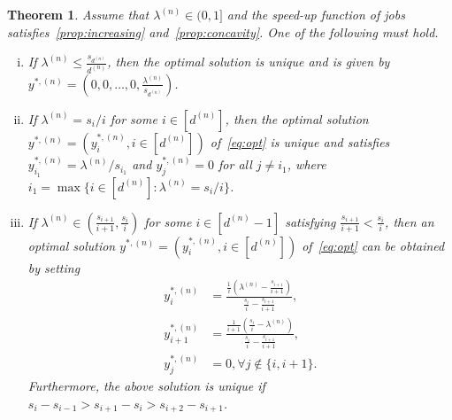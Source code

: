 \documentclass[a4paper]{article}
\theoremstyle{plain}
\newtheorem{thm}{Theorem}%
\theoremstyle{definition}
\theoremstyle{case}
\theoremstyle{remark}
\newcommand{\brac}[1]{\left(#1\right)}
\begin{document}
\begin{thm} 
\label{thm:optimization}
Assume that $\lambda^{(n)} \in (0,1]$ and the speed-up function of jobs satisfies~\eqref{prop:increasing} and~\eqref{prop:concavity}.
One of the following must hold.
\begin{enumerate}[(i)]
    \item If $\lambda^{(n)} \leq \frac{s_{d^{(n)}}}{d^{(n)}}$, then the optimal solution is unique and is given by $y^{*,(n)}=\left(0,0,\ldots,0,\frac{\lambda^{(n)}}{s_{d^{(n)}}}\right)$.
    
    \item If $\lambda^{(n)}=s_i/i$ for some $i \in [d^{(n)}]$, then the optimal solution $y^{*,(n)}=(y^{*,(n)}_i, i\in [d^{(n)}])$ of~\eqref{eq:opt} is unique and satisfies $y_{i_1}^{*,(n)}=\lambda^{(n)}/s_{i_1}$ and $y_j^{*,(n)}=0$ for all $j\neq i_1$, where $i_1=\max\{i\in [d^{(n)}]: \lambda^{(n)}=s_i/i\}$.
    
    \item If $\lambda^{(n)} \in \left(\frac{s_{i+1}}{i+1},\frac{s_i}{i}\right)$ for some $i\in [d^{(n)}-1]$ satisfying $\frac{s_{i+1}}{i+1}<\frac{s_i}{i}$, then an optimal solution $y^{*,(n)}=(y^{*,(n)}_i, i\in [d^{(n)}])$ of~\eqref{eq:opt} can be obtained by setting
    \begin{align}
        y_i^{*,(n)}&=\frac{\frac{1}{i}\brac{\lambda^{(n)}-\frac{s_{i+1}}{i+1}}}{\frac{s_i}{i}-\frac{s_{i+1}}{i+1}},\label{eq:first_comp}\\
        y_{i+1}^{*,(n)}&=\frac{\frac{1}{i+1}\brac{\frac{s_{i}}{i}-\lambda^{(n)}}}{\frac{s_i}{i}-\frac{s_{i+1}}{i+1}},\label{eq:second_comp}\\
        y_j^{*,(n)}&=0, \forall j \notin \{i,i+1\}\label{eq:other_comp}.
    \end{align}
    Furthermore, the above solution is unique if $s_i-s_{i-1} > s_{i+1} - s_{i} > s_{i+2}-s_{i+1}$.
\end{enumerate} 
\end{thm}
%
\end{document}
